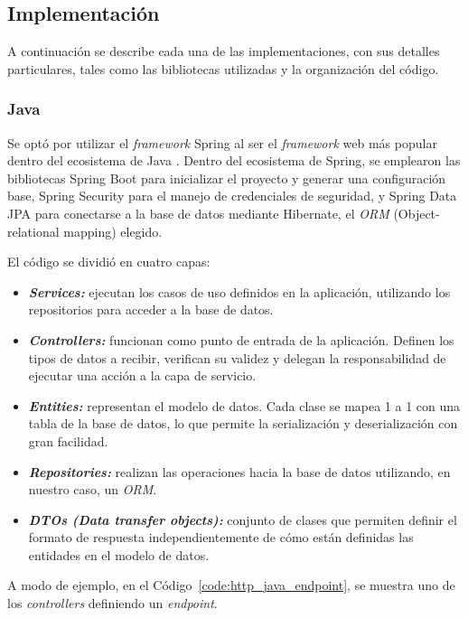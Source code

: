 \documentclass[11pt]{article}
\let\Oldsubsection\subsection
\renewcommand{\subsection}{\FloatBarrier\Oldsubsection}
\let\Oldsubsubsection\subsubsection
\renewcommand{\subsubsection}{\FloatBarrier\Oldsubsubsection}
\newcommand{\english}[1]{\textit{#1}}
\newcommand{\technical}[1]{\textit{#1}}
\begin{document}
\subsection{Implementación}

A continuación se describe cada una de las implementaciones, con sus detalles particulares, tales como las bibliotecas utilizadas y la organización del código.

\subsubsection{Java}

Se optó por utilizar el \english{framework} Spring al ser el \textit{framework} web más popular dentro del ecosistema de Java \cite{http:java}. Dentro del ecosistema de Spring, se emplearon las bibliotecas Spring Boot para inicializar el proyecto y generar una configuración base, Spring Security para el manejo de credenciales de seguridad, y Spring Data JPA para conectarse a la base de datos mediante Hibernate, el \textit{ORM} (Object-relational mapping) elegido.

El código se dividió en cuatro capas:

\begin{itemize}
    \item \textbf{\technical{Services:}} ejecutan los casos de uso definidos en la aplicación, utilizando los repositorios para acceder a la base de datos.
    \item \textbf{\technical{Controllers:}} funcionan como punto de entrada de la aplicación. Definen los tipos de datos a recibir, verifican su validez y delegan la responsabilidad de ejecutar una acción a la capa de servicio.
    \item \textbf{\technical{Entities:}} representan el modelo de datos. Cada clase se mapea 1 a 1 con una tabla de la base de datos, lo que permite la serialización y deserialización con gran facilidad.
    \item \textbf{\technical{Repositories:}} realizan las operaciones hacia la base de datos utilizando, en nuestro caso, un \textit{ORM}.
    \item \textbf{\technical{DTOs (Data transfer objects):}} conjunto de clases que permiten definir el formato de respuesta independientemente de cómo están definidas las entidades en el modelo de datos.
\end{itemize}

A modo de ejemplo, en el Código~\ref{code:http_java_endpoint}, se muestra uno de los \english{controllers} definiendo un \english{endpoint}.
\end{document}

